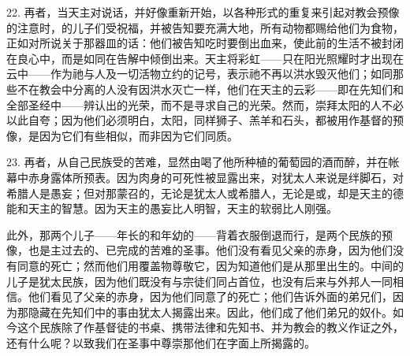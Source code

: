 22. 再者，当天主对说话，并好像重新开始，以各种形式的重复来引起对教会预像的注意时，的儿子们受祝福，并被告知要充满大地，所有动物都赐给他们为食物，正如对所说关于那器皿的话：他们被告知吃时要倒出血来，使此前的生活不被封闭在良心中，而是如同在告解中倾倒出来。天主将彩虹——只在阳光照耀时才出现在云中——作为祂与人及一切活物立约的记号，表示祂不再以洪水毁灭他们；如同那些不在教会中分离的人没有因洪水灭亡一样，他们在天主的云彩——即在先知们和全部圣经中——辨认出的光荣，而不是寻求自己的光荣。然而，崇拜太阳的人不必以此自夸；因为他们必须明白，太阳，同样狮子、羔羊和石头，都被用作基督的预像，是因为它们有些相似，而非因为它们同质。\par

23. 再者，从自己民族受的苦难，显然由喝了他所种植的葡萄园的酒而醉，并在帐幕中赤身露体所预表。因为肉身的可死性被显露出来，对犹太人来说是绊脚石，对希腊人是愚妄；但对那蒙召的，无论是犹太人或希腊人，无论是或，却是天主的德能和天主的智慧。因为天主的愚妄比人明智，天主的软弱比人刚强。\par

此外，那两个儿子——年长的和年幼的——背着衣服倒退而行，是两个民族的预像，也是主过去的、已完成的苦难的圣事。他们没有看见父亲的赤身，因为他们没有同意的死亡；然而他们用覆盖物尊敬它，因为知道他们是从那里出生的。中间的儿子是犹太民族，因为他们既没有与宗徒们同占首位，也没有后来与外邦人一同相信。他们看见了父亲的赤身，因为他们同意了的死亡；他们告诉外面的弟兄们，因为那隐藏在先知们中的事由犹太人揭露出来。因此，他们成了他们弟兄的奴仆。如今这个民族除了作基督徒的书桌、携带法律和先知书、并为教会的教义作证之外，还有什么呢？以致我们在圣事中尊崇那他们在字面上所揭露的。\par

